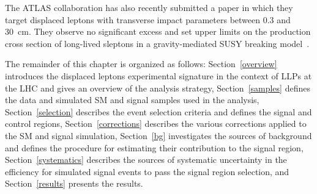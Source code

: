 The ATLAS collaboration has also recently submitted a paper in which they target displaced leptons with transverse impact parameters between \num{0.3} and \SI{30}{\cm}. They observe no significant excess and set upper limits on the production cross section of long-lived sleptons in a gravity-mediated SUSY breaking model~\cite{atlas_displaced_leptons}.

The remainder of this chapter is organized as follows: Section~\ref{overview} introduces the displaced leptons experimental signature in the context of LLPs at the LHC and gives an overview of the analysis strategy, Section~\ref{samples} defines the data and simulated SM and signal samples used in the analysis, Section~\ref{selection} describes the event selection criteria and defines the signal and control regions, Section~\ref{corrections} describes the various corrections applied to the SM and signal simulation, Section~\ref{bg} investigates the sources of background and defines the procedure for estimating their contribution to the signal region, Section~\ref{systematics} describes the sources of systematic uncertainty in the efficiency for simulated signal events to pass the signal region selection, and Section~\ref{results} presents the results.








